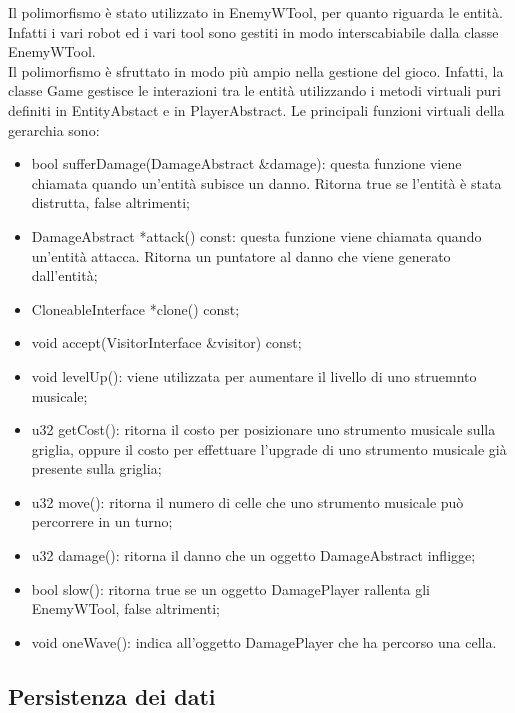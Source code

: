 \documentclass[11pt]{article}
\begin{document}
Il polimorfismo è stato utilizzato in EnemyWTool, per quanto riguarda le entità.
Infatti i vari robot ed i vari tool sono gestiti in modo interscabiabile dalla 
classe EnemyWTool.\\
Il polimorfismo è sfruttato in modo più ampio nella gestione del gioco. Infatti,
la classe Game gestisce le interazioni tra le entità utilizzando i metodi
virtuali puri definiti in EntityAbstact e in PlayerAbstract. 
Le principali funzioni virtuali della gerarchia sono:
\begin{itemize}
	\item bool sufferDamage(DamageAbstract \&damage): questa funzione viene
		chiamata quando un'entità subisce un danno. Ritorna true se l'entità
		è stata distrutta, false altrimenti;

	\item DamageAbstract *attack() const: questa funzione viene chiamata quando
		un'entità attacca. Ritorna un puntatore al danno che viene generato
		dall'entità;

	\item CloneableInterface *clone() const;

	\item void accept(VisitorInterface \&visitor) const;


	\item void levelUp(): viene utilizzata per aumentare il livello di uno
		struemnto musicale;

	\item u32 getCost(): ritorna il costo per posizionare uno strumento musicale
		sulla griglia, oppure il costo per effettuare l'upgrade di uno
		strumento musicale già presente sulla griglia;

	\item u32 move(): ritorna il numero di celle che uno strumento musicale
		può percorrere in un turno;

	\item u32 damage(): ritorna il danno che un oggetto DamageAbstract infligge;

	\item bool slow(): ritorna true se un oggetto DamagePlayer rallenta gli
		EnemyWTool, false altrimenti;

	\item void oneWave(): indica all'oggetto DamagePlayer che ha percorso una
		cella.
\end{itemize}



\subsection{Persistenza dei dati}
\end{document}
